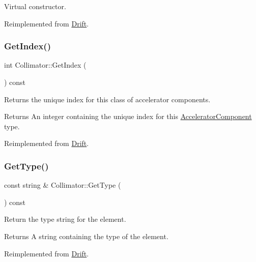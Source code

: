 Virtual constructor. 

Reimplemented from \hyperlink{classDrift_ae47df31297596e13944364d602c95ce5}{Drift}.

\mbox{\label{classCollimator_a158a9d8999d55a27efe4e56e5af8b56a}} 
\subsubsection{\texorpdfstring{Get\+Index()}{GetIndex()}}
{\footnotesize\ttfamily int Collimator\+::\+Get\+Index (\begin{DoxyParamCaption}{ }\end{DoxyParamCaption}) const\hspace{0.3cm}{\ttfamily [virtual]}}

Returns the unique index for this class of accelerator components. \begin{DoxyReturn}{Returns}
An integer containing the unique index for this \hyperlink{classAcceleratorComponent}{Accelerator\+Component} type. 
\end{DoxyReturn}


Reimplemented from \hyperlink{classDrift_a19bc19d48348912f8693e3ebbf9e92f2}{Drift}.

\mbox{\label{classCollimator_aab811743031565147b965ca9b9fdfbc4}} 
\subsubsection{\texorpdfstring{Get\+Type()}{GetType()}}
{\footnotesize\ttfamily const string \& Collimator\+::\+Get\+Type (\begin{DoxyParamCaption}{ }\end{DoxyParamCaption}) const\hspace{0.3cm}{\ttfamily [virtual]}}

Return the type string for the element. \begin{DoxyReturn}{Returns}
A string containing the type of the element. 
\end{DoxyReturn}


Reimplemented from \hyperlink{classDrift_a9f5e7d0aafd8689a4420b3d5e7b6879e}{Drift}.

\mbox{\label{classCollimator_acbcf691bfcf53d652d14b9381c711fe7}} 
